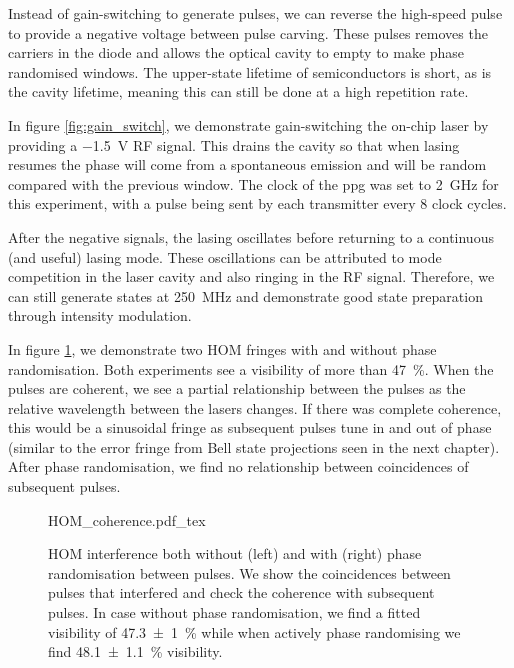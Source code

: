 Instead of gain-switching to generate pulses, we can reverse the high-speed pulse to provide a negative voltage between pulse carving. These pulses removes the carriers in the diode and allows the optical cavity to empty to make phase randomised windows. The upper-state lifetime of semiconductors is short, as is the cavity lifetime, meaning this can still be done at a high repetition rate. 

In figure \ref{fig:gain_switch}, we demonstrate gain-switching the on-chip laser by providing a \SI{-1.5}{V} RF signal. This drains the cavity so that when lasing resumes the phase will come from a spontaneous emission and will be random compared with the previous window. The clock of the \ac{ppg} was set to \SI{2}{GHz} for this experiment, with a pulse being sent by each transmitter every 8 clock cycles. 

After the negative signals, the lasing oscillates before returning to a continuous (and useful) lasing mode. These oscillations can be attributed to mode competition in the laser cavity and also ringing in the RF signal. Therefore, we can still generate states at \SI{250}{MHz} and demonstrate good state preparation through intensity modulation.

In figure \ref{fig:HOM_coherence}, we demonstrate two \ac{HOM} fringes with and without phase randomisation. Both experiments see a visibility of more than \SI{47}{\percent}. When the pulses are coherent, we see a partial relationship between the pulses as the relative wavelength between the lasers changes. If there was complete coherence, this would be a sinusoidal fringe as subsequent pulses tune in and out of phase (similar to the error fringe from Bell state projections seen in the next chapter). After phase randomisation, we find no relationship between coincidences of subsequent pulses.

\begin{figure}[tp]
	\centering
	\tiny
	\def\svgwidth{\textwidth} 
	{HOM_coherence.pdf_tex}
	\caption[Hong-Ou-Mandel interference with and without phase randomisation]{\ac{HOM} interference both without (left) and with (right) phase randomisation between pulses. We show the coincidences between pulses that interfered and check the coherence with subsequent pulses. In case without phase randomisation, we find a fitted visibility of \SI{47.3(10)}{\percent} while when actively phase randomising we find \SI{48.1(11)}{\percent} visibility.}
	\label{fig:HOM_coherence}
\end{figure}

